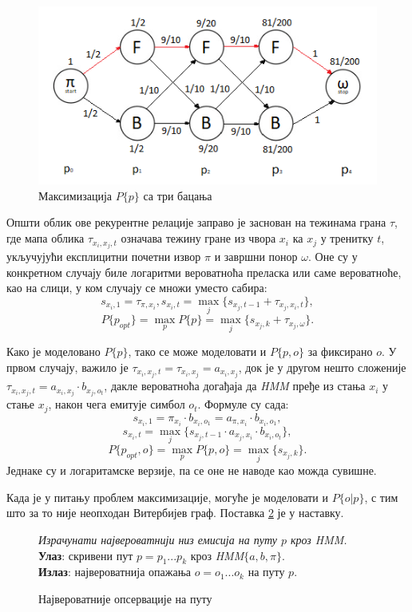 \documentclass[12pt,oneside]{memoir}
\newenvironment{problem}[1][!ht]
{\renewcommand{\algorithmcfname}{Проблем}
\begin{figure}[!ht]
\centering
  \begin{minipage}{.94\linewidth}
	\begin{algorithm}[#1]%
  }{\end{algorithm}
  \end{minipage}
\end{figure}}
\begin{document}
\begin{CJK}{UTF8}{ipxm}
\begin{figure}[!ht]
  \centering
  \includegraphics[width=.9\textwidth]{tri_bacanja.png}
  \caption{Максимизација $P\{p\}$ са три бацања}
  \label{fig:tribac}
\end{figure}

Општи облик ове рекурентне релације заправо је заснован на тежинама грана $\tau$, где мапа облика $\tau_{x_i, x_j, t}$ означава тежину гране из чвора $x_i$ ка $x_j$ у тренитку $t$, укључујући експлицитни почетни извор $\pi$ и завршни понор $\omega$. Оне су у конкретном случају биле логаритми вероватноћа преласка или саме вероватноће, као на слици, у ком случају се множи уместо сабира: $$s_{x_i, 1} = \tau_{\pi, x_i}, s_{x_i, t} = \max_j \{s_{x_j, t-1} + \tau_{x_j, x_i, t}\},$$ $$P\{p_{opt}\} = \max_p P\{p\} = \max_j \{s_{x_j, k} + \tau_{x_j, \omega}\}.$$

Како је моделовано $P\{p\}$, тако се може моделовати и $P\{p, o\}$ за фиксирано $o$. У првом случају, важило је $\tau_{x_i, x_j, t} = \tau_{x_i, x_j} = a_{x_i, x_j}$, док је у другом нешто сложеније $\tau_{x_i, x_j, t} = a_{x_i, x_j} \cdot b_{x_j, o_t}$, дакле вероватноћа догађаја да \textit{HMM} пређе из стања $x_i$ у стање $x_j$, након чега емитује симбол $o_t$. Формуле су сада: $$s_{x_i, 1} = \pi_{x_i} \cdot b_{x_i, o_1} = a_{\pi, x_i} \cdot b_{x_i, o_1},$$ $$s_{x_i, t} = \max_j \{s_{x_j, t-1} \cdot a_{x_j, x_i} \cdot b_{x_i, o_t}\},$$ $$P\{p_{opt}, o\} = \max_p P\{p, o\} = \max_j \{s_{x_j, k}\}.$$ Једнаке су и логаритамске верзије, па се оне не наводе као можда сувишне.

Када је у питању проблем максимизације, могуће је моделовати и $P\{o | p\}$, с тим што за то није неопходан Витербијев граф. Поставка \ref{prob:maxops} је у наставку.

\begin{problem}[H]
  \SetAlgoLined
  \textit{Израчунати највероватнији низ емисија на путу $p$ кроз \textit{HMM}.}\\
  \textbf{Улаз}: скривени пут $p = p_1...p_k$ кроз \textit{HMM}$\{a, b, \pi\}$.\\
  \textbf{Излаз}: највероватнија опажања $o = o_1...o_k$ на путу $p$.
  \caption{Највероватније опсервације на путу}
  \label{prob:maxops}
\end{problem}


\end{CJK}
\end{document}
